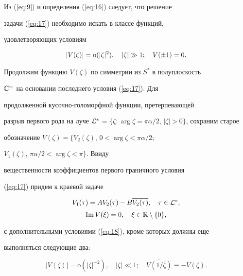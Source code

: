 Из (\ref{eq:9}) и определения (\ref{eq:16}) следует, что решение


задачи (\ref{eq:17}) необходимо искать в классе функций,


удовлетворяющих условиям


\begin{equation} 


|V(\zeta)|={\rm o}(|\zeta|^2),\quad |\zeta|\gg 1;\quad


V(\pm 1)=0.


\label{eq:18}


\end{equation}


Продолжим функцию $V(\zeta)$ по симметрии из $S^*$ в полуплоскость


${\Bbb C}^+$ на основании последнего условия (\ref{eq:17}). Для


продолженной кусочно-голоморфной функции, претерпевающей


разрыв первого рода на луче ${\cal L}^*$ = $\{\zeta:


\arg\zeta=\pi\alpha /2$, $|\zeta|>0\}$, сохраним старое


обозначение $V(\zeta)= \{V_2(\zeta)$, $0<\arg\zeta<\pi\alpha/2$;


$V_1(\zeta)$, $\pi\alpha /2<\arg\zeta<\pi\}$. Ввиду


вещественности коэффициентов первого граничного условия


(\ref{eq:17}) придем к краевой задаче


\begin{equation}


\begin{array}{c}


V_1(\tau)= AV_2(\tau) - B \overline {V_2(\tau)},


\quad \tau\in {\cal L}^*,\\[2mm]


\im V(\xi)=0, \quad \xi\in{\Bbb R}


\setminus\{0\},


\end{array}


\label{eq:19}


\end{equation}


с дополнительными условиями (\ref{eq:18}), кроме которых должны еще


выполняться следующие два:


\begin{equation} %


|V(\zeta)|=\mathrm o(|\zeta|^{-2}),\quad |\zeta|\ll 1;\quad


\overline {V(1/\overline\zeta)}\equiv -V(\zeta).


\label{eq:20}


\end{equation}


